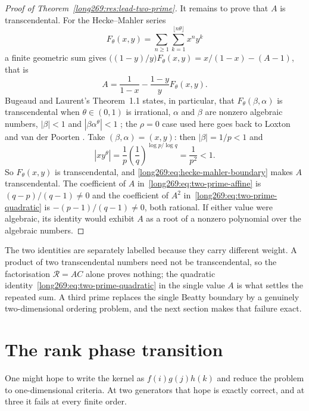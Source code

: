 \documentclass[11pt]{article}
\begin{document}
\begin{proof}[Proof of Theorem~\ref{long269:res:lead-two-prime}]
It remains to prove that $A$ is transcendental.  For the Hecke--Mahler series
\[
 F_\theta(x,y)=\sum_{n\ge1}\sum_{k=1}^{\lfloor n\theta\rfloor}x^ny^k
\]
a finite geometric sum gives
$\bigl((1-y)/y\bigr)F_\theta(x,y)=x/(1-x)-(A-1)$, that is
\begin{equation}\label{long269:eq:hecke-mahler-boundary}
 A=\frac1{1-x}-\frac{1-y}{y}F_\theta(x,y).
\end{equation}
Bugeaud and Laurent's Theorem~1.1 states, in particular, that
$F_\theta(\beta,\alpha)$ is transcendental when $\theta\in(0,1)$ is irrational,
$\alpha$ and $\beta$ are nonzero algebraic numbers, $|\beta|<1$ and
$|\beta\alpha^\theta|<1$ \cite[p.~61, Theorem~1.1]{bugeaudlaurent2023}; the
$\rho=0$ case used here goes back to Loxton and van der Poorten
\cite[p.~40, Theorem~8]{loxtonvdp1977}.  Take $(\beta,\alpha)=(x,y)$: then
$|\beta|=1/p<1$ and
\[
 |xy^{\theta}|=\frac1p\left(\frac1q\right)^{\log p/\log q}=\frac1{p^{2}}<1 .
\]
So $F_\theta(x,y)$ is transcendental, and \eqref{long269:eq:hecke-mahler-boundary}
makes $A$ transcendental.  The coefficient of $A$
in~\eqref{long269:eq:two-prime-affine} is $(q-p)/(q-1)\ne0$ and the coefficient of
$A^{2}$ in~\eqref{long269:eq:two-prime-quadratic} is $-(p-1)/(q-1)\ne0$, both rational.
If either value were algebraic, its identity would exhibit $A$ as a root of a
nonzero polynomial over the algebraic numbers.
\end{proof}

\noindent The two identities are separately labelled
\label{long269:res:two-prime-transcendence}\label{long269:res:two-prime-repeated-transcendence}
because they carry different weight.  A product of two transcendental numbers
need not be transcendental, so the factorisation $\mathcal R=AC$ alone proves
nothing; the quadratic identity~\eqref{long269:eq:two-prime-quadratic} in the single
value $A$ is what settles the repeated sum.  A third prime replaces the single
Beatty boundary by a genuinely two-dimensional ordering problem, and the next
section makes that failure exact.

\section{The rank phase transition}\label{long269:sec:rank}

One might hope to write the kernel as $f(i)g(j)h(k)$ and reduce the problem to
one-dimensional criteria.  At two generators that hope is exactly correct, and
at three it fails at every finite order.
\end{document}
